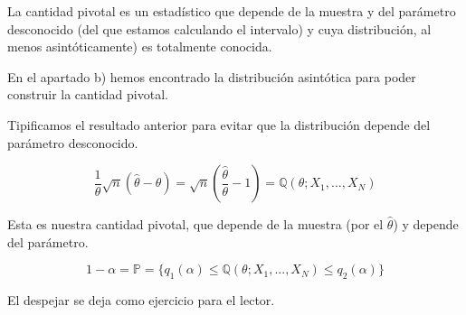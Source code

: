 \begin{problem}[5]
\spart
La cantidad pivotal es un estadístico que depende de la muestra y del parámetro desconocido (del que estamos calculando el intervalo) y cuya distribución, al menos asintóticamente) es totalmente conocida.

En el apartado b) hemos encontrado la distribución asintótica para poder construir la cantidad pivotal.

Tipificamos el resultado anterior para evitar que la distribución depende del parámetro desconocido.

\[
\frac{1}{\theta} \sqrt{n}(\hat{\theta} - \theta)  = 
\sqrt{n} \left(\frac{\hat{\theta}}{\theta} - 1 \right) = \mathbb{Q}(\theta;X_1,...,X_N)
\]

Esta es nuestra cantidad pivotal, que depende de la muestra (por el $\hat{\theta}$) y depende del parámetro.

\[1-\alpha  = \mathbb{P} = \{q_1(\alpha) \leq \mathbb{Q}(\theta;X_1,...,X_N) \leq q_2 (\alpha)\}\]


El despejar se deja como ejercicio para el lector.

\end{problem}

